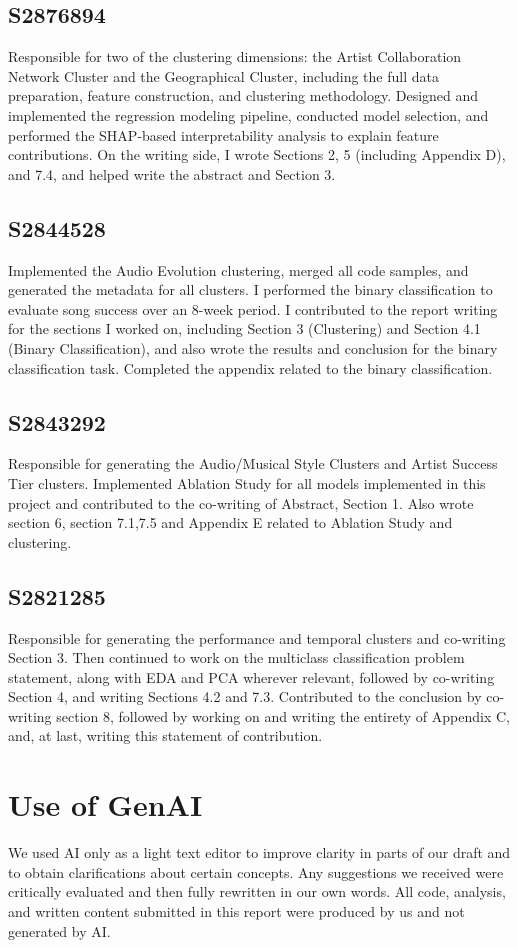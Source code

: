 \documentclass{article}
\begin{document}
\subsection*{S2876894}
Responsible for two of the clustering dimensions: the Artist Collaboration Network Cluster and the Geographical Cluster, including the full data preparation, feature construction, and clustering methodology. Designed and implemented the regression modeling pipeline, conducted model selection, and performed the SHAP-based interpretability analysis to explain feature contributions. On the writing side, I wrote Sections 2, 5 (including Appendix D), and 7.4, and helped write the abstract and Section 3.


\subsection*{S2844528} 
Implemented the Audio Evolution clustering, merged all code samples, and generated the metadata for all clusters. I performed the binary classification to evaluate song success over an 8-week period. I contributed to the report writing for the sections I worked on, including Section 3 (Clustering) and Section 4.1 (Binary Classification), and also wrote the results and conclusion for the binary classification task. Completed the appendix related to the binary classification.


\subsection*{S2843292} Responsible for generating the Audio/Musical Style Clusters and Artist Success Tier clusters. Implemented Ablation Study for all models implemented in this project and contributed to the co-writing of Abstract, Section 1. Also wrote section 6, section 7.1,7.5 and Appendix E related to Ablation Study and clustering.
\subsection*{S2821285}Responsible for generating the performance and temporal clusters and co-writing Section 3. Then continued to work on the multiclass classification problem statement, along with EDA and PCA wherever relevant, followed by co-writing Section 4, and writing Sections 4.2 and 7.3. Contributed to the conclusion by co-writing section 8, followed by working on and writing the entirety of Appendix C, and, at last, writing this statement of contribution.

\section*{Use of GenAI}
We used AI only as a light text editor to improve clarity in parts of our draft and to obtain clarifications about certain concepts. Any suggestions we received were critically evaluated and then fully rewritten in our own words. All code, analysis, and written content submitted in this report were produced by us and not generated by AI.
\end{document}

